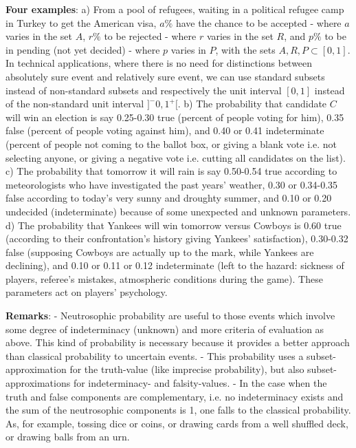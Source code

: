 \documentclass[12pt]{article}
\begin{document}
{\bf  Four examples}:
\newline a) From a pool of refugees, waiting in a political refugee camp in Turkey to get the American visa, $a\%$ have the chance to be accepted - where $a$ varies in the set $A$, $r\%$ to be rejected - where $r$ varies in the set $R$, and $p\%$ to be in pending (not yet decided) - where $p$ varies in $P$, with the sets $A, R, P \subset [0,1]$. In technical applications, where there is no need for distinctions between absolutely sure event and relatively sure event, we can use standard subsets instead of non-standard subsets and respectively the unit interval $[0,1]$ instead of the non-standard unit interval $]^-0, 1^+[$.
\newline b) The probability that candidate $C$ will win an election is say 0.25-0.30 true (percent of people voting for him), 0.35 false (percent of people voting against him), and 0.40 or 0.41 indeterminate (percent of people not coming to the ballot box, or giving a blank vote i.e. not selecting anyone, or giving a negative vote i.e. cutting all candidates on the list).
\newline c) The probability that tomorrow it will rain is say 0.50-0.54 true according to meteorologists who have investigated the past years' weather, 0.30 or 0.34-0.35 false according to today's very sunny and droughty summer, and 0.10 or 0.20 undecided (indeterminate) because of some unexpected and unknown parameters.
\newline d) The probability that Yankees will win tomorrow versus Cowboys is 0.60 true (according to their confrontation's history giving Yankees' satisfaction), 0.30-0.32 false (supposing Cowboys are actually up to the mark, while Yankees are declining), and 0.10 or 0.11 or 0.12 indeterminate (left to the hazard: sickness of players, referee's mistakes, atmospheric conditions during the game).  These parameters act on players' psychology.

{\bf Remarks}:
\newline - Neutrosophic probability are useful to those events which involve some degree of indeterminacy (unknown) and more criteria of evaluation as above.  This kind of probability is necessary because it provides a better approach than classical probability to uncertain events.  
\newline - This probability uses a subset-approximation for the truth-value (like imprecise probability), but also subset-approximations for indeterminacy- and falsity-values.
\newline - In the case when the truth and false components are complementary, i.e. no indeterminacy exists and the sum of the neutrosophic components is 1, one falls to the classical probability.  As, for example, tossing dice or coins, or drawing cards from a well shuffled deck, or drawing balls from an urn.
\end{document}
